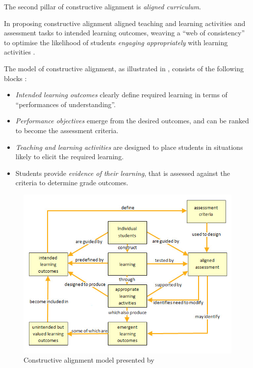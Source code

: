 The second pillar of constructive alignment is \emph{aligned curriculum}.

In proposing constructive alignment \citet{Biggs:1996c} aligned teaching and learning activities and assessment tasks to intended learning outcomes, weaving a ``web of consistency'' to optimise the likelihood of students \emph{engaging appropriately} with learning activities \cite{Biggs:1999}.


The model of constructive alignment, as illustrated in , consists of the following blocks \cite{Houghton:2004}:
\begin{itemize}[noitemsep,nolistsep]
	\item \emph{Intended learning outcomes} clearly define required learning in terms of ``performances of understanding''.
	\item \emph{Performance objectives} emerge from the desired outcomes, and can be ranked to become the assessment criteria.
	\item \emph{Teaching and learning activities} are designed to place students in situations likely to elicit the required learning.
	\item Students provide \emph{evidence of their learning}, that is assessed against the criteria to determine grade outcomes.
\end{itemize}

\begin{figure}[htpb]
	\centering 
	\includegraphics[width=\columnwidth]{Houghton_constructive_alignment_1}
	\caption{Constructive alignment model presented by \citet{Houghton:2004}}
	\label{fig:Houghton}
\end{figure}


